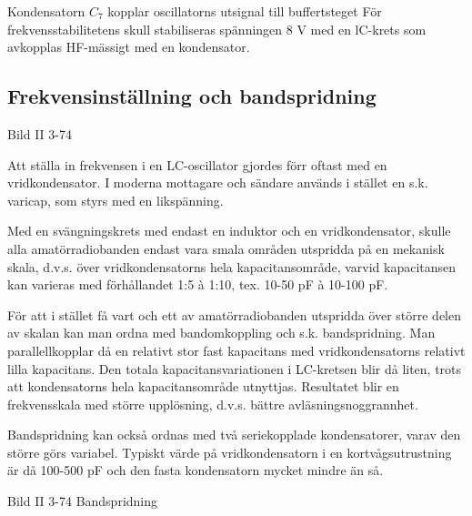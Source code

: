 Kondensatorn \(C_7\) kopplar oscillatorns utsignal till buffertsteget
För frekvensstabilitetens skull stabiliseras spänningen 8 V med en
lC-krets som avkopplas HF-mässigt med en kondensator.

\subsection{Frekvensinställning och bandspridning}

Bild II 3-74

Att ställa in frekvensen i en LC-oscillator gjordes förr oftast med en
vridkondensator. I moderna mottagare och sändare används i stället en
s.k. varicap, som styrs med en likspänning.

Med en svängningskrets med endast en induktor och en vridkondensator,
skulle alla amatörradiobanden endast vara smala områden utspridda på
en mekanisk skala, d.v.s.  över vridkondensatorns hela
kapacitansområde, varvid kapacitansen kan varieras med förhållandet
1:5 à 1:10, tex. 10-50 pF à 10-100 pF.

För att i stället få vart och ett av amatörradiobanden utspridda över
större delen av skalan kan man ordna med bandomkoppling och
s.k. bandspridning. Man parallellkopplar då en relativt stor fast
kapacitans med vridkondensatorns relativt lilla kapacitans. Den totala
kapacitansvariationen i LC-kretsen blir då liten, trots att
kondensatorns hela kapacitansområde utnyttjas. Resultatet blir en
frekvensskala med större upplösning, d.v.s. bättre
avläsningsnoggrannhet.

Bandspridning kan också ordnas med två seriekopplade kondensatorer,
varav den större görs variabel. Typiskt värde på vridkondensatorn i en
kortvågsutrustning är då 100-500 pF och den fasta kondensatorn mycket
mindre än så.

Bild II 3-74 Bandspridning
